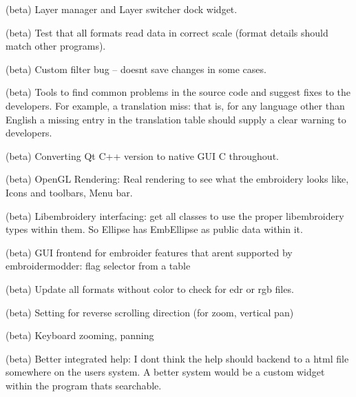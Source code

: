 \begin{DoxyRefList}
\label{todo__todo000156}%
%
(beta) Layer manager and Layer switcher dock widget.

\label{todo__todo000157}%
%
(beta) Test that all formats read data in correct scale (format details should match other programs).

\label{todo__todo000158}%
%
(beta) Custom filter bug -- doesn\textquotesingle{}t save changes in some cases.

\label{todo__todo000159}%
%
(beta) Tools to find common problems in the source code and suggest fixes to the developers. For example, a translation miss\+: that is, for any language other than English a missing entry in the translation table should supply a clear warning to developers.

\label{todo__todo000160}%
%
(beta) Converting Qt C++ version to native GUI C throughout.

\label{todo__todo000161}%
%
(beta) Open\+GL Rendering\+: {\ttfamily Real} rendering to see what the embroidery looks like, Icons and toolbars, Menu bar.

\label{todo__todo000162}%
%
(beta) Libembroidery interfacing\+: get all classes to use the proper libembroidery types within them. So {\ttfamily Ellipse} has {\ttfamily Emb\+Ellipse} as public data within it.

\label{todo__todo000164}%
%
(beta) GUI frontend for embroider features that aren\textquotesingle{}t supported by embroidermodder\+: flag selector from a table

\label{todo__todo000165}%
%
(beta) Update all formats without color to check for edr or rgb files.

\label{todo__todo000166}%
%
(beta) Setting for reverse scrolling direction (for zoom, vertical pan)

\label{todo__todo000167}%
%
(beta) Keyboard zooming, panning

\label{todo__todo000168}%
%
(beta) Better integrated help\+: I don\textquotesingle{}t think the help should backend to a html file somewhere on the user\textquotesingle{}s system. A better system would be a custom widget within the program that\textquotesingle{}s searchable.


\end{DoxyRefList}
